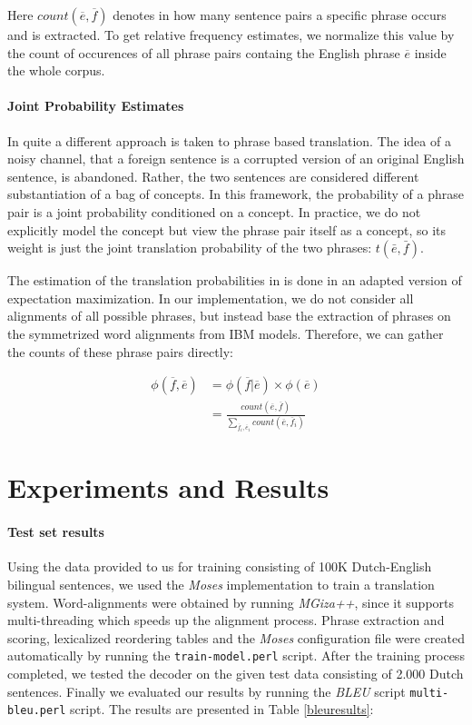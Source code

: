 \documentclass[11pt]{article}
\begin{document}
Here $count(\overline{e}, \overline{f})$ denotes in how many sentence pairs a specific phrase occurs and is extracted. To get relative frequency estimates, we normalize this value by the count of occurences of all phrase pairs containg the English phrase $\overline{e}$ inside the whole corpus.


\paragraph{Joint Probability Estimates}
In \cite{marcu2002} quite a different approach is taken to phrase based translation. The idea of a noisy channel, that a foreign sentence is a corrupted version of an original English sentence, is abandoned. Rather, the two sentences are considered different substantiation of a bag of concepts. In this framework, the probability of a phrase pair is a joint probability conditioned on a concept. In practice, we do not explicitly model the concept but view the phrase pair itself as a concept, so its weight is just the joint translation probability of the two phrases: $t(\bar{e},\bar{f})$.

The estimation of the translation probabilities in \cite{marcu2002} is done in an adapted version of expectation maximization. 
In our implementation, we do not consider all alignments of all possible phrases, but instead base the extraction of phrases on the symmetrized word alignments from IBM models. Therefore, we can gather the counts of these phrase pairs directly:

\begin{align*}
\phi(\overline{f},\overline{e}) &=\phi(\overline{f}|\overline{e}) \times \phi(\overline{e}) \\
&=\frac{count(\overline{e}, \overline{f})}{\sum_{\overline{f}_i, \overline{e}_i} count(\overline{e},\overline{f}_i)}
\end{align*}


\section{Experiments and Results}
\label{Eval}

\paragraph{Test set results}
Using the data provided to us for training consisting of 100K Dutch-English bilingual sentences, we used the \textit{Moses} implementation to train a translation system. Word-alignments were obtained by running \textit{MGiza++}, since it supports multi-threading which speeds up the alignment process. Phrase extraction and scoring, lexicalized reordering tables and the \textit{Moses} configuration file were created automatically by running the \verb|train-model.perl| script. After the training process completed, we tested the decoder on the given test data consisting of 2.000 Dutch sentences. Finally we evaluated our results by running the \textit{BLEU} script \verb|multi-bleu.perl| script. The results are presented in Table \ref{bleuresults}:
\end{document}
